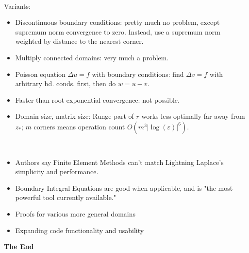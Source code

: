\documentclass{seminar}
\begin{document}
\begin{slide} %
{} \small \\

Variants:
\begin{itemize}
	\item Discontinuous boundary conditions: pretty much no problem, except supremum norm convergence to zero. Instead, use a supremum norm weighted by distance to the nearest corner.
	\item Multiply connected domains: very much a problem.
	\item Poisson equation $\Delta u = f$ with boundary conditions: find $\Delta v = f$ with arbitrary bd. conds. first, then do $w=u-v$.
	\item Faster than root exponential convergence: not possible.
	\item Domain size, matrix size: Runge part of $r$ works less optimally far away from $z_*$; $m$ corners means operation count $O(m^3 |\log{(\varepsilon)}|^6)$.
\end{itemize}
\end{slide} %

\begin{slide} %
{} \small \\

\begin{itemize}
	\item Authors say Finite Element Methods can't match Lightning Laplace's simplicity and performance.
	\item Boundary Integral Equations are good when applicable, and is "the most powerful tool currently available."
	\item Proofs for various more general domains
	\item Expanding code functionality and usability 
\end{itemize}
\end{slide} %




\begin{slide} %
\vspace*{\fill}
\begin{center}
{\large\bf\color{Green} The End}
\end{center}
\vspace*{\fill}
\end{slide}
\end{document}
